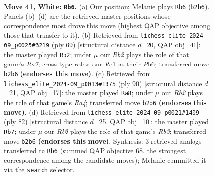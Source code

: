\documentclass[11pt]{article}
\begin{document}
\clearpage

\begin{figure}[p]\centering
\begin{subfigure}{0.46\textwidth}\centering
\resizebox{\linewidth}{!}{%
\newchessgame
\chessboard[
  setfen={1r6/1p3p1k/p3p3/6K1/P3P3/5P1P/1R5P/4R3 w - - 11 41},
  showmover=false,
  pgfstyle=straightmove, color=movearrow, markmove={b2-b6}
]}
\caption{}
\end{subfigure}\hfill
\begin{subfigure}{0.46\textwidth}\centering
\resizebox{\linewidth}{!}{%
\newchessgame
\chessboard[
  setfen={2k5/6R1/1p6/p3p2p/4P2P/1P3P2/r5PK/8 b - - 0 35},
  showmover=false,
  pgfstyle=straightmove, color=movearrow, markmove={a2-b2}
]}
\caption{}
\end{subfigure}
\\[4pt]
\begin{subfigure}{0.46\textwidth}\centering
\resizebox{\linewidth}{!}{%
\newchessgame
\chessboard[
  setfen={8/5p2/6p1/1k4Pp/R2P3P/5P2/p5K1/r7 w - - 1 46},
  showmover=false,
  pgfstyle=straightmove, color=movearrow, markmove={a4-a8}
]}
\caption{}
\end{subfigure}\hfill
\begin{subfigure}{0.46\textwidth}\centering
\resizebox{\linewidth}{!}{%
\newchessgame
\chessboard[
  setfen={8/6p1/5p1p/2k1pP1P/4P3/1R3P2/1p4K1/1r6 w - - 14 42},
  showmover=false,
  pgfstyle=straightmove, color=movearrow, markmove={b3-b7}
]}
\caption{}
\end{subfigure}
\caption{\textbf{Move 41, White: \texttt{Rb6}.} (a) Our position; Melanie plays \texttt{Rb6} (\texttt{b2b6}). Panels (b)--(d) are the retrieved master positions whose correspondence most drove this move (highest QAP objective among those that transfer to it). (b) Retrieved from \texttt{lichess\_elite\_2024-09\_p0025\#3219} (ply 69) [structural distance $d$=20, QAP obj=41]: the master played \texttt{Rb2}; under $\mu$ our \emph{Rb2} plays the role of that game's \emph{Ra7}; cross-type roles: our \emph{R}e1 as their \emph{P}b6; transferred move \texttt{b2b6} \textbf{(endorses this move)}. (c) Retrieved from \texttt{lichess\_elite\_2024-09\_p0013\#1375} (ply 90) [structural distance $d$=21, QAP obj=17]: the master played \texttt{Ra8}; under $\mu$ our \emph{Rb2} plays the role of that game's \emph{Ra4}; transferred move \texttt{b2b6} \textbf{(endorses this move)}. (d) Retrieved from \texttt{lichess\_elite\_2024-09\_p0021\#1409} (ply 82) [structural distance $d$=25, QAP obj=10]: the master played \texttt{Rb7}; under $\mu$ our \emph{Rb2} plays the role of that game's \emph{Rb3}; transferred move \texttt{b2b6} \textbf{(endorses this move)}. Synthesis: 3 retrieved analogs transferred to \texttt{Rb6} (summed QAP objective 68, the strongest correspondence among the candidate moves); Melanie committed it via the \texttt{search} selector.}
\label{fig:thought-m80}
\end{figure}
\end{document}
